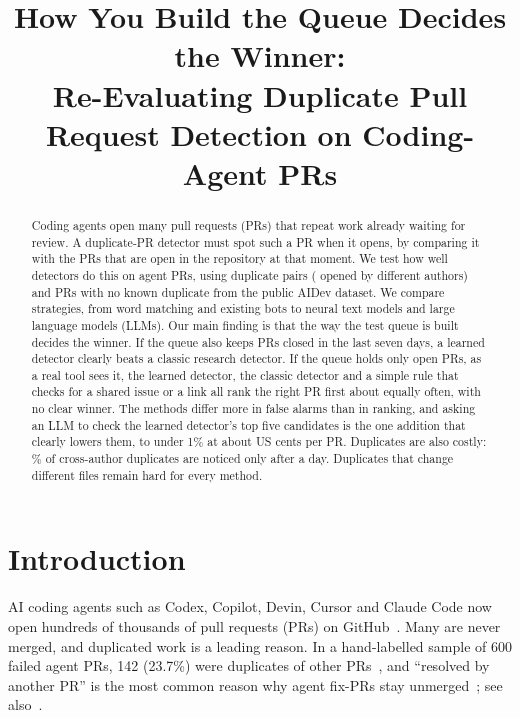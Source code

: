 \documentclass[10pt,conference]{IEEEtran}
\begin{document}
\title{How You Build the Queue Decides the Winner:\\Re-Evaluating Duplicate Pull Request Detection on Coding-Agent PRs}
\author{}
\maketitle

\begin{abstract}\normalfont
Coding agents open many pull requests (PRs) that repeat work already waiting for review. A duplicate-PR detector must spot such a PR when it opens, by comparing it with the PRs that are open in the repository at that moment. We test how well detectors do this on agent PRs, using \nPairs{} duplicate pairs (\nCross{} opened by different authors) and \nNeg{} PRs with no known duplicate from the public AIDev dataset. We compare \nStrategies{} strategies, from word matching and existing bots to neural text models and large language models (LLMs). Our main finding is that the way the test queue is built decides the winner. If the queue also keeps PRs closed in the last seven days, a learned detector clearly beats a classic research detector. If the queue holds only open PRs, as a real tool sees it, the learned detector, the classic detector and a simple rule that checks for a shared issue or a link all rank the right PR first about equally often, with no clear winner. The methods differ more in false alarms than in ranking, and asking an LLM to check the learned detector's top five candidates is the one addition that clearly lowers them, to under 1\% at about \costHaikuPerPR{} US cents per PR. Duplicates are also costly: \dupLateOneD\% of cross-author duplicates are noticed only after a day. Duplicates that change different files remain hard for every method.
\end{abstract}

\section{Introduction}
AI coding agents such as Codex, Copilot, Devin, Cursor and Claude Code now open hundreds of thousands of pull requests (PRs) on GitHub~\cite{li2026aidev}. Many are never merged, and duplicated work is a leading reason. In a hand-labelled sample of 600 failed agent PRs, 142 (23.7\%) were duplicates of other PRs~\cite{ehsani2026fail}, and ``resolved by another PR'' is the most common reason why agent fix-PRs stay unmerged~\cite{alam2026unmerged}; see also~\cite{nakashima2026rejected,abujadallah2026rejection}.
\end{document}
